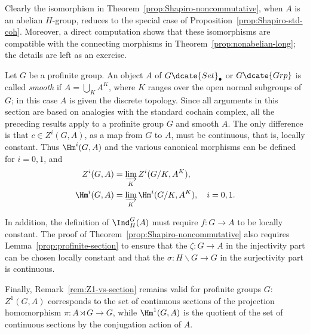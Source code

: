 Clearly the isomorphism in Theorem~\ref{prop:Shapiro-noncommutative}, when
$A$ is an abelian $H$-group, reduces to the special case of
Proposition~\ref{prop:Shapiro-std-coh}. Moreover, a direct computation shows
that these isomorphisms are compatible with the connecting morphisms in
Theorem~\ref{prop:nonabelian-long}; the details are left as an exercise.

\begin{remark}\label{rem:pro-finite-coh-nonabelian}
	Let $G$ be a profinite group. An object $A$ of
	$G\dcate{Set}_\bullet$ or $G\dcate{Grp}$ is called \emph{smooth} if
	$A=\bigcup_KA^K$, where $K$ ranges over the open normal subgroups of $G$;
	in this case $A$ is given the discrete topology. Since all arguments in
	this section are based on analogies with the standard cochain complex, all
	the preceding results apply to a profinite group $G$ and smooth $A$. The
	only difference is that $c\in Z^i(G,A)$, as a map from $G$ to $A$, must
	be continuous, that is, locally constant. Thus $\Hm^i(G,A)$ and the
	various canonical morphisms can be defined for $i=0,1$, and
	\begin{align*}
		Z^i(G, A) & = \varinjlim_K Z^i(G/K, A^K), \\
		\Hm^i(G, A) & = \varinjlim_K \Hm^i(G/K, A^K), \quad i = 0, 1.
	\end{align*}

	In addition, the definition of $\Ind^G_H(A)$ must require $f:G\to A$ to
	be locally constant. The proof of
	Theorem~\ref{prop:Shapiro-noncommutative} also requires
	Lemma~\ref{prop:profinite-section} to ensure that the $\zeta:G\to A$ in
	the injectivity part can be chosen locally constant and that the
	$\sigma:H\backslash G\to G$ in the surjectivity part is continuous.

	Finally, Remark~\ref{rem:Z1-vs-section} remains valid for profinite groups
	$G$: $Z^1(G,A)$ corresponds to the set of continuous sections of the
	projection homomorphism $\pi:A\rtimes G\to G$, while $\Hm^1(G,A)$ is the
	quotient of the set of continuous sections by the conjugation action of
	$A$.
\end{remark}
